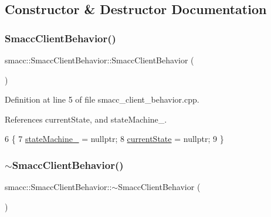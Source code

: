 \subsection{Constructor \& Destructor Documentation}
\mbox{\label{classsmacc_1_1SmaccClientBehavior_a5fbea298db572d6c7558bfd1a65a942b}} 
\subsubsection{\texorpdfstring{Smacc\+Client\+Behavior()}{SmaccClientBehavior()}}
{\footnotesize\ttfamily smacc\+::\+Smacc\+Client\+Behavior\+::\+Smacc\+Client\+Behavior (\begin{DoxyParamCaption}{ }\end{DoxyParamCaption})}



Definition at line 5 of file smacc\+\_\+client\+\_\+behavior.\+cpp.



References current\+State, and state\+Machine\+\_\+.


\begin{DoxyCode}
6     \{
7         \hyperlink{classsmacc_1_1SmaccClientBehavior_a7950b5684d6de0a8e8959c0936ce9a19}{stateMachine\_} = \textcolor{keyword}{nullptr};
8         \hyperlink{classsmacc_1_1SmaccClientBehavior_af76fc9b877542ed5caf033f820c107d0}{currentState} = \textcolor{keyword}{nullptr};
9     \}
\end{DoxyCode}
\mbox{\label{classsmacc_1_1SmaccClientBehavior_a93dbf03b9c76a580c2de47d5bef7de0f}} 
\subsubsection{\texorpdfstring{$\sim$\+Smacc\+Client\+Behavior()}{~SmaccClientBehavior()}}
{\footnotesize\ttfamily smacc\+::\+Smacc\+Client\+Behavior\+::$\sim$\+Smacc\+Client\+Behavior (\begin{DoxyParamCaption}{ }\end{DoxyParamCaption})\hspace{0.3cm}{\ttfamily [virtual]}}




